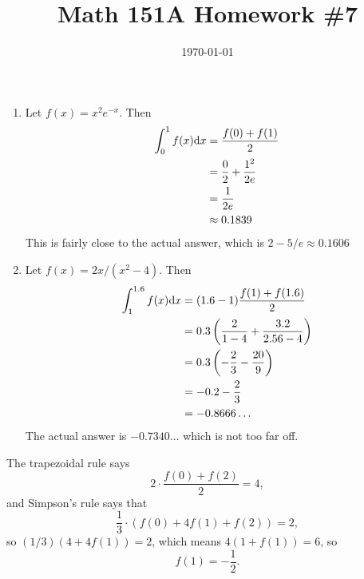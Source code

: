 \documentclass{article}
\date{\today}
\title{Math 151A Homework \#7}
\begin{document}
\maketitle

\begin{prob}
\end{prob}
\begin{enumerate}[label=(\alph*)]
    \item Let $f(x) = x^2 e^{-x}$. Then
        \begin{align*}
            \int_0^1 f(x) \mathrm{d} x &= \frac{f(0)+f(1)}{2} \\
                               &= \frac{0}{2} + \frac{1^2}{2e} \\
                               &= \frac{1}{2e} \\
                               &\approx 0.1839
        \end{align*}
        This is fairly close to the actual answer, which is $2-5/e\approx 0.1606$
    \item Let $f(x) = 2x/(x^2-4)$. Then
        \begin{align*}
            \int_1^{1.6} f(x) \mathrm{d} x &= (1.6-1) \frac{f(1)+f(1.6)}{2} \\
                                   &= 0.3 \left( \frac{2}{1-4} + \frac{3.2}{2.56-4} \right) \\
                                   &= 0.3 \left( -\frac{2}{3} - \frac{20}{9} \right) \\
                                   &= -0.2 - \frac{2}{3} \\
                                   &= -0.8666\dots
        \end{align*}
        The actual answer is $-0.7340\dots$ which is not too far off.
\end{enumerate}


\bigskip
\begin{prob}
\end{prob}
The trapezoidal rule says
\[ 2 \cdot \frac{f(0)+f(2)}{2} = 4, \]
and Simpson's rule says that
\[ \frac{1}{3} \cdot \left( f(0)+4f(1)+f(2) \right) = 2, \]
so $(1/3)(4+4f(1))=2$, which means $4(1+f(1))=6$, so
\[ f(1)=- \frac{1}{2}. \]
\end{document}
